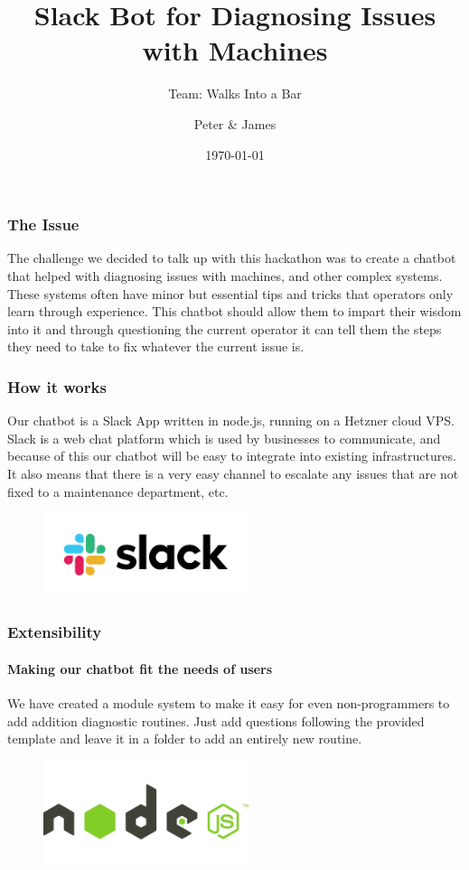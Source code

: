 \documentclass[aspectratio=169]{beamer}
\title{Slack Bot for Diagnosing Issues with Machines}
\subtitle{Team: Walks Into a Bar}
\author{Peter \& James}
\institute[]{DMS Hackathon 2020}
\date{\today}
\begin{document}
\maketitleslide

\begin{frame}{}
    \frametitle{The Issue}    
    The challenge we decided to talk up with this hackathon was to create a chatbot that helped with diagnosing issues with machines, and other complex systems. These systems often have minor but essential tips and tricks that operators only learn through experience. This chatbot should allow them to impart their wisdom into it and through questioning the current operator it can tell them the steps they need to take to fix whatever the current issue is.
\end{frame}

\begin{frame}{}
    \frametitle{How it works}
    Our chatbot is a Slack App written in node.js, running on a Hetzner cloud VPS.
    Slack is a web chat platform which is used by businesses to communicate, and because of this our chatbot will be easy to integrate into existing infrastructures. It also means that there is a very easy channel to escalate any issues that are not fixed to a maintenance department, etc.
    \begin{figure}
        \centering
        \includegraphics[width=6cm]{Slack_RGB.png}
        \label{figforgot comma:slack_logo}
    \end{figure}
\end{frame}

\begin{frame}{}
    \frametitle{Extensibility}
    \framesubtitle{Making our chatbot fit the needs of users}
    We have created a module system to make it easy for even non-programmers to add addition diagnostic routines. Just add questions following the provided template and leave it in a folder to add an entirely new routine.
    \begin{figure}
        \centering
        \includegraphics[width=6cm]{node-js-736399.png}
        \label{fig:node_logo}
    \end{figure}
\end{frame}
\end{document}
